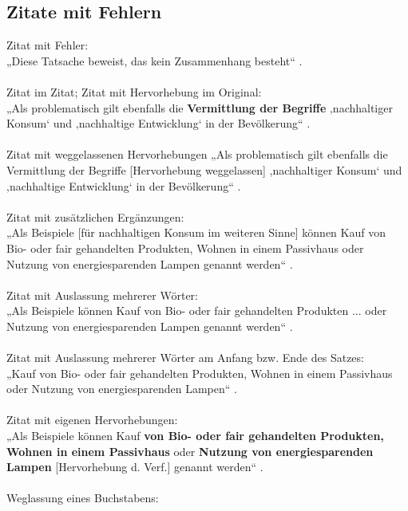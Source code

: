 \subsection{Zitate mit Fehlern}
Zitat mit Fehler:\\
„Diese Tatsache beweist, das \quoteSic{} kein Zusammenhang besteht“ \parencite[40]{primarysource}.\\
\\
Zitat im Zitat; Zitat mit Hervorhebung im Original:\\
„Als problematisch gilt ebenfalls die \textbf{Vermittlung der Begriffe} ‚nachhaltiger Konsum‘ und ‚nachhaltige Entwicklung‘ in der Bevölkerung“ \parencite[40]{primarysource}.\\
\\
Zitat mit weggelassenen Hervorhebungen
„Als problematisch gilt ebenfalls die Vermittlung der Begriffe [Hervorhebung weggelassen]
,nachhaltiger Konsum‘ und ‚nachhaltige Entwicklung‘ in der Bevölkerung“ \parencite[40]{primarysource}.\\
\\
Zitat mit zusätzlichen Ergänzungen:\\
„Als Beispiele [für nachhaltigen Konsum im weiteren Sinne] können Kauf von Bio- oder fair gehandelten Produkten, Wohnen in einem Passivhaus oder Nutzung von energiesparenden Lampen genannt werden“ \parencite[40]{primarysource}.\\
\\
Zitat mit Auslassung mehrerer Wörter:\\
„Als Beispiele können Kauf von Bio- oder fair gehandelten Produkten ... oder Nutzung von
energiesparenden Lampen genannt werden“ \parencite[40]{primarysource}.\\
\\
Zitat mit Auslassung mehrerer Wörter am Anfang bzw. Ende des Satzes:\\
„Kauf von Bio- oder fair gehandelten Produkten, Wohnen in einem Passivhaus oder Nutzung
von energiesparenden Lampen“ \parencite[40]{primarysource}.\\
\\
Zitat mit eigenen Hervorhebungen:\\
„Als Beispiele können Kauf \textbf{von Bio- oder fair gehandelten Produkten, Wohnen in einem
Passivhaus} oder \textbf{Nutzung von energiesparenden Lampen} [Hervorhebung d. Verf.] genannt
werden“ \parencite[40]{primarysource}.\\
\\
Weglassung eines Buchstabens:\\
